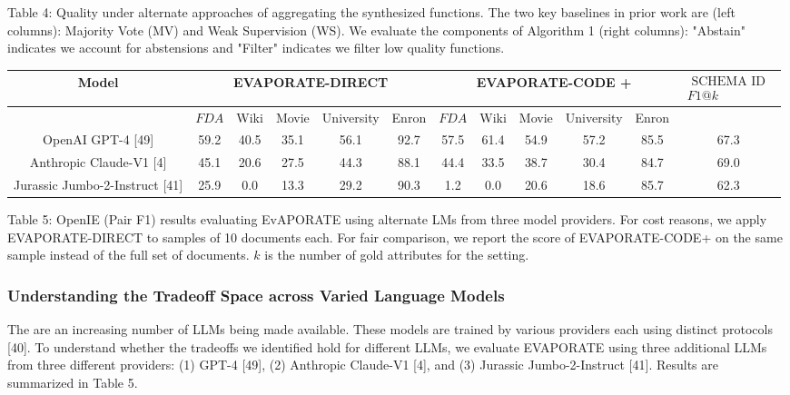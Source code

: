 \documentclass[10pt]{article}
\begin{document}
Table 4: Quality under alternate approaches of aggregating the synthesized functions. The two key baselines in prior work are (left columns): Majority Vote (MV) and Weak Supervision (WS). We evaluate the components of Algorithm 1 (right columns): "Abstain" indicates we account for abstensions and "Filter" indicates we filter low quality functions.

\begin{center}
\begin{tabular}{|c|c|c|c|c|c|c|c|c|c|c|c|}
\hline
\multirow{2}{*}{Model} & \multicolumn{5}{|c|}{EVAPORATE-DIRECT} & \multicolumn{5}{|c|}{EVAPORATE-CODE +} & \multirow{2}{*}{$\begin{array}{c}\text { SCHEMA ID } \\
F 1 @ k\end{array}$} \\
\hline
 & $F D A$ & Wiki & Movie & University & Enron & $F D A$ & Wiki & Movie & University & Enron &  \\
\hline
OpenAI GPT-4 [49] & 59.2 & 40.5 & 35.1 & 56.1 & 92.7 & 57.5 & 61.4 & 54.9 & 57.2 & 85.5 & 67.3 \\
\hline
Anthropic Claude-V1 [4] & 45.1 & 20.6 & 27.5 & 44.3 & 88.1 & 44.4 & 33.5 & 38.7 & 30.4 & 84.7 & 69.0 \\
\hline
Jurassic Jumbo-2-Instruct [41] & 25.9 & 0.0 & 13.3 & 29.2 & 90.3 & 1.2 & 0.0 & 20.6 & 18.6 & 85.7 & 62.3 \\
\hline
\end{tabular}
\end{center}

Table 5: OpenIE (Pair F1) results evaluating EvAPORATE using alternate LMs from three model providers. For cost reasons, we apply EVAPORATE-DIRECT to samples of 10 documents each. For fair comparison, we report the score of EVAPORATE-CODE+ on the same sample instead of the full set of documents. $k$ is the number of gold attributes for the setting.

\subsubsection{Understanding the Tradeoff Space across Varied Language Models}
The are an increasing number of LLMs being made available. These models are trained by various providers each using distinct protocols [40]. To understand whether the tradeoffs we identified hold for different LLMs, we evaluate EVAPORATE using three additional LLMs from three different providers: (1) GPT-4 [49], (2) Anthropic Claude-V1 [4], and (3) Jurassic Jumbo-2-Instruct [41]. Results are summarized in Table 5.
\end{document}

